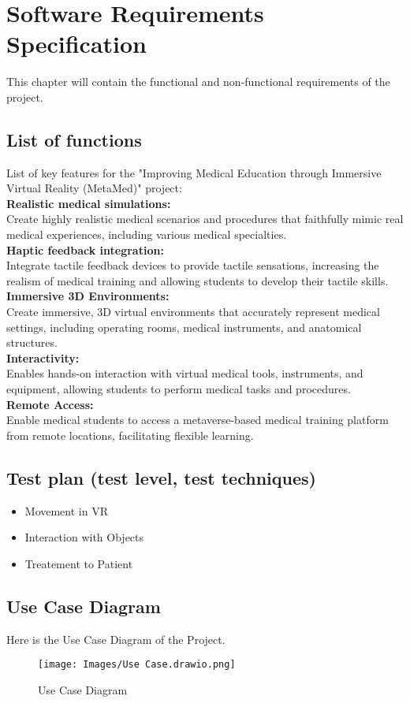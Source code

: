 \chapter{Software Requirements Specification}
\label{ch:srs}
This chapter will contain the functional and non-functional requirements of the project.
\section{List of functions}
List of key features for the "Improving Medical Education through Immersive Virtual Reality (MetaMed)" project:\\
\textbf{Realistic medical simulations:}\\ Create highly realistic medical scenarios and procedures that faithfully mimic real medical experiences, including various medical specialties.\\
\textbf{Haptic feedback integration:}\\ Integrate tactile feedback devices to provide tactile sensations, increasing the realism of medical training and allowing students to develop their tactile skills.\\
\textbf{Immersive 3D Environments:}\\ Create immersive, 3D virtual environments that accurately represent medical settings, including operating rooms, medical instruments, and anatomical structures.\\
\textbf{Interactivity:}\\Enables hands-on interaction with virtual medical tools, instruments, and equipment, allowing students to perform medical tasks and procedures.\\
\textbf{Remote Access:}\\ Enable medical students to access a metaverse-based medical training platform from remote locations, facilitating flexible learning.
\section{Test plan (test level, test techniques)}
\begin{itemize}
    \item Movement in VR 
    \item Interaction with Objects
    \item Treatement to Patient
\end{itemize}
\section{Use Case Diagram}
Here is the Use Case Diagram of the Project.
\begin{figure}[h]
    \centering
    \texttt{[image: Images/Use Case.drawio.png]}
    \caption{Use Case Diagram}
    \label{fig:system-diagram}
\end{figure}


